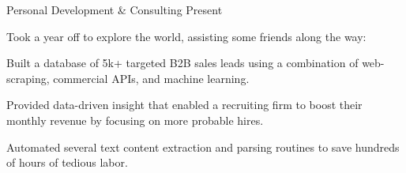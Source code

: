 
\begin{cventries}

  \cventrynew
	{Personal Development \& Consulting}    
    {Present} 
    {}
    {Took a year off to explore the world, assisting some friends along the way:
    \vspace{4.0mm}
    \begin{cvitems}
		 \item {Built a database of 5k+ targeted B2B sales leads using a combination of web-scraping, commercial APIs, and machine learning.}
		 \item {Provided data-driven insight that enabled a recruiting firm to boost their monthly revenue by focusing on more probable hires.}		 
		 \item {Automated several text content extraction and parsing routines to save hundreds of hours of tedious labor.}
      \end{cvitems}
    } 


\end{cventries}
